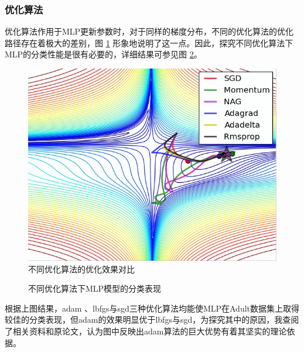 \documentclass[12pt,a4paper]{article}
\theoremstyle{definition}
\begin{document}
{\subsubsection{优化算法}

优化算法作用于MLP更新参数时，对于同样的梯度分布，不同的优化算法的优化路径存在着极大的差别，图 \ref{fig:optim-ref} 形象地说明了这一点。因此，探究不同优化算法下MLP的分类性能是很有必要的，详细结果可参见图 \ref{fig:optim1}。

\begin{figure}[H]
	\centering
	\includegraphics[width=0.5\linewidth]{img/optim_example.png}
	\caption{不同优化算法的优化效果对比 \cite{optim_example}}
	\label{fig:optim-ref}
\end{figure}

\begin{figure}[H]
	\centering
	\caption{不同优化算法下MLP模型的分类表现}
	\label{fig:optim1}
\end{figure}

根据上图结果，adam \cite{adam}、lbfgs与sgd三种优化算法均能使MLP在Adult数据集上取得较佳的分类表现，但adam的效果明显优于lbfgs与sgd，为探究其中的原因，我查阅了相关资料和原论文，认为图中反映出adam算法的巨大优势有着其坚实的理论依据。

}
\end{document}
